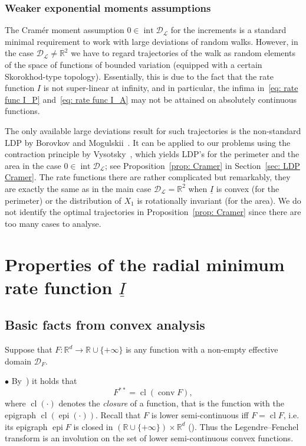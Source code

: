 \documentclass[AHL,Unicode,published]{cedram}
\DeclareMathOperator{\conv}{conv}
\DeclareMathOperator{\cl}{cl}
\DeclareMathOperator{\intr}{int}
\DeclareMathOperator{\epi}{epi}
\newcommand{\ubar}[1]{\underline{#1}}
\newcommand{\Rbb}{\mathbb{R}}
\newcommand{\Dcl}{\mathcal{D}}
\newcommand{\Lcl}{\mathcal{L}}
\begin{document}
\subsubsection{Weaker exponential moments assumptions}
The Cram\'er moment assumption $0 \in \intr \Dcl_{\Lcl}$ for the increments is a standard minimal requirement to work with large deviations of random walks. However, in the case $\Dcl_{\Lcl} \neq \Rbb^2$ we have to regard trajectories of the walk as random elements of the space of functions of bounded variation (equipped with a certain Skorokhod-type topology). Essentially, this is due to the fact that the rate function $I$ is not super-linear at infinity, and in particular, the infima in~\eqref{eq: rate func I_P} and~\eqref{eq: rate func I_A} may not be attained on absolutely continuous functions.

The only available large deviations result for such trajectories is the non-standard LDP by Borovkov and Mogulskii~\cite{BorovkovMogulskii2}. It can be applied to our problems using the contraction principle by Vysotsky~\cite{VysotskyNote}, which yields LDP's for the perimeter and the area in the case $0 \in \intr \Dcl_{\Lcl}$; see Proposition~\ref{prop: Cramer} in Section~\ref{sec: LDP Cramer}. The rate functions there are rather complicated but remarkably, they are exactly the same as in the main case $\Dcl_{\Lcl} = \Rbb^2$ when $\ubar I$ is convex (for the perimeter) or the distribution of $X_1$ is rotationally invariant (for the area). We do not identify the optimal trajectories in Proposition~\ref{prop: Cramer} since there are too many cases to analyse.

\section{Properties of the radial minimum rate function \texorpdfstring{$\ubar I$}{ubar I}} \label{Sec Convex}
\subsection{Basic facts from convex analysis} \label{Sec Convex basics}
Suppose that $F: \Rbb^d \to \Rbb \cup \{+\infty \}$ is any function with a non-empty effective domain $\Dcl_F$.


$\bullet$ By~\cite[Theorem~12.2 and Corollary~12.1.1]{Rockafellar}) it holds that
\begin{equation}\label{eq: involution}
F^{**}= \cl (\conv F),
\end{equation}
where $\cl (\cdot)$ denotes the \emph{closure} of a function, that is the function with the epigraph $\cl (\epi (\cdot))$. Recall that $F$ is lower semi-continuous iff $F = \cl F$, i.e. its epigraph $\epi F$ is closed in $(\Rbb \cup \{+\infty\})\times \Rbb^d$ (\cite[Theorem~7.1]{Rockafellar}). Thus the Legendre--Fenchel transform is an involution on the set of lower semi-continuous convex functions.
\end{document}
